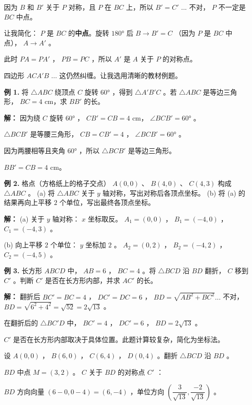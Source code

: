 \begin{workedexamples}
因为 $B$ 和 $B'$ 关于 $P$ 对称，且 $P$ 在 $BC$ 上，所以 $B' = C'$ ... 不对， $P$ 不一定是 $BC$ 中点。

让我简化： $P$ 是 $BC$ 的\textbf{中点}。旋转 $180°$ 后 $B \to B' = C$ （因为 $P$ 是 $BC$ 中点）， $A \to A'$ 。

此时 $PA = PA'$ ， $PB = PC$ ，所以 $A'$ 是 $A$ 关于 $P$ 的对称点。

四边形 $ACA'B$ ... 这仍然纠缠。让我选用清晰的教材例题。

\textbf{例 1.} 将 $\triangle ABC$ 绕顶点 $C$ 旋转 $60°$ ，得到 $\triangle A'B'C$ 。若 $\triangle ABC$ 是等边三角形， $BC = 4$ cm，求 $BB'$ 的长。

\textbf{解：}
因为绕 $C$ 旋转 $60°$ ， $CB' = CB = 4$ cm， $\angle BCB' = 60°$ 。

$\triangle BCB'$ 是等腰三角形， $CB = CB' = 4$ ， $\angle BCB' = 60°$ 。

因为两腰相等且夹角 $60°$ ，所以 $\triangle BCB'$ 是等边三角形。

$BB' = CB = 4$ cm。

\textbf{例 2.} 格点（方格纸上的格子交点） $A(0,0)$ 、 $B(4,0)$ 、 $C(4,3)$ 构成 $\triangle ABC$ 。
(a) 将 $\triangle ABC$ 关于 $y$ 轴对称，写出对称后各顶点坐标。
(b) 将 (a) 的结果再向上平移 $2$ 个单位，写出最终各顶点坐标。

\textbf{解：}
(a) 关于 $y$ 轴对称： $x$ 坐标取反。
$A_1 = (0, 0)$ ， $B_1 = (-4, 0)$ ， $C_1 = (-4, 3)$ 。

(b) 向上平移 $2$ 个单位： $y$ 坐标加 $2$ 。
$A_2 = (0, 2)$ ， $B_2 = (-4, 2)$ ， $C_2 = (-4, 5)$ 。

\textbf{例 3.} 长方形 $ABCD$ 中， $AB = 6$ ， $BC = 4$ 。将 $\triangle BCD$ 沿 $BD$ 翻折， $C$ 移到 $C'$ 。判断 $C'$ 是否在长方形内部，并求 $AC'$ 的长。

\textbf{解：}
翻折后 $BC' = BC = 4$ ， $DC' = DC = 6$ ， $BD = \sqrt{AB^2 + BC^2} ... $ 不对， $BD = \sqrt{6^2 + 4^2} = \sqrt{52} = 2\sqrt{13}$ 。

在翻折后的 $\triangle BC'D$ 中， $BC' = 4$ ， $DC' = 6$ ， $BD = 2\sqrt{13}$ 。

$C'$ 是否在长方形内部取决于具体位置。此题计算较复杂，简化为坐标法。

设 $A(0,0)$ ， $B(6,0)$ ， $C(6,4)$ ， $D(0,4)$ 。翻折 $\triangle BCD$ 沿 $BD$ 。

$BD$ 中点 $M = (3, 2)$ 。 $C$ 关于 $BD$ 的对称点 $C'$ ：

$BD$ 方向向量 $(6-0, 0-4) = (6, -4)$ ，单位方向 $\left(\dfrac{3}{\sqrt{13}}, \dfrac{-2}{\sqrt{13}}\right)$ 。


\end{workedexamples}
